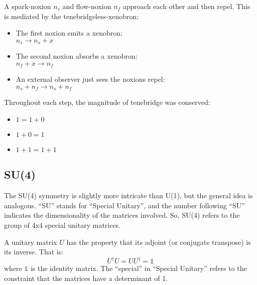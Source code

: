 \begin{example}[U(1) Conservation]
  A spark-noxion \(n_s\) and flow-noxion \(n_f\) approach each other and then repel. This is mediated by the tenebridgeless-xenobron:
  \begin{itemize}
    \item The first noxion emits a xenobron:\\
          \(n_s \rightarrow n_s + x\)
    \item The second noxion absorbs a xenobron:\\
          \(n_f + x \rightarrow n_f\)
    \item An external observer just sees the noxions repel:\\
          \(n_s + n_f \rightarrow n_s + n_f\)
  \end{itemize}
  Throughout each step, the magnitude of tenebridge was conserved:
  \begin{itemize}
    \item \(1 = 1 + 0\)
    \item \(1 + 0 = 1\)
    \item \(1 + 1 = 1 + 1\)
  \end{itemize}
\end{example}

\subsection{SU(4)}
The SU(4) symmetry is slightly more intricate than U(1), but the general idea is analogous. ``SU'' stands for ``Special Unitary'', and the number following ``SU'' indicates the dimensionality of the matrices involved. So, SU(4) refers to the group of 4x4 special unitary matrices.

A unitary matrix \(U\) has the property that its adjoint (or conjugate transpose) is its inverse. That is:
\[U^{\dag}U=UU^{\dag}=\mathbb{1}\]
where \(\mathbb{1}\) is the identity matrix. The ``special'' in ``Special Unitary'' refers to the constraint that the matrices have a determinant of 1.

